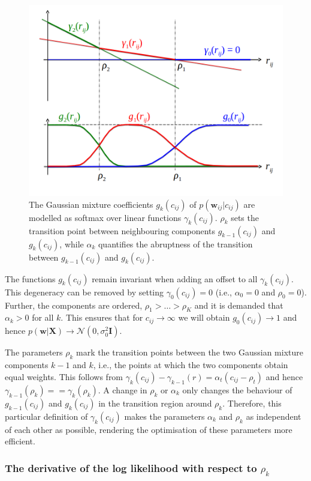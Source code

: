 \documentclass[11pt,a4paper,twoside]{book}
\newcommand{\eq}{\!=\!}
\newcommand{\Gauss}{\mathcal{N}}
\newcommand{\I}{\mathbf{I}}
\newcommand{\cij}{c_{ij}}
\newcommand{\w}{\mathbf{w}}
\newcommand{\wij}{\mathbf{w}_{ij}}
\newcommand{\X}{\mathbf{X}}
\theoremstyle{definition}
\theoremstyle{definition}
\theoremstyle{remark}
\begin{document}
\begin{figure}

{\centering \includegraphics[width=0.5\linewidth]{img/theory/softmax_linear_fct} 

}

\caption{The Gaussian mixture coefficients
\(g_k(\cij)\) of \(p(\wij|\cij)\) are modelled as softmax over linear
functions \(\gamma_k(\cij)\). \(\rho_k\) sets the transition point
between neighbouring components \(g_{k-1}(\cij)\) and \(g_k(\cij)\),
while \(\alpha_k\) quantifies the abruptness of the transition between
\(g_{k-1}(\cij)\) and \(g_k(\cij)\).}\label{fig:softmax-linear-fct}
\end{figure}

The functions \(g_k(\cij)\) remain invariant when adding an offset to
all \(\gamma_k(\cij)\). This degeneracy can be removed by setting
\(\gamma_0(\cij) \eq 0\) (i.e., \(\alpha_0 \eq 0\) and
\(\rho_0 \eq 0\)). Further, the components are ordered,
\(\rho_1> \ldots > \rho_K\) and it is demanded that \(\alpha_k > 0\) for
all \(k\). This ensures that for \(\cij \rightarrow \infty\) we will
obtain \(g_0(\cij) \rightarrow 1\) and hence
\(p(\w | \X) \rightarrow \Gauss(0, \sigma_0^2 \I )\).

The parameters \(\rho_k\) mark the transition points between the two
Gaussian mixture components \(k-1\) and \(k\), i.e., the points at which
the two components obtain equal weights. This follows from
\(\gamma_k(\cij) - \gamma_{k-1}(r) \eq \alpha_{t} ( \cij - \rho_{t})\)
and hence \(\gamma_{k-1}(\rho_k) \eq= \gamma_k(\rho_k)\). A change in
\(\rho_k\) or \(\alpha_k\) only changes the behaviour of
\(g_{k-1}(\cij)\) and \(g_k(\cij)\) in the transition region around
\(\rho_k\). Therefore, this particular definition of \(\gamma_k(\cij)\)
makes the parameters \(\alpha_k\) and \(\rho_k\) as independent of each
other as possible, rendering the optimisation of these parameters more
efficient.

\subsubsection{\texorpdfstring{The derivative of the log likelihood with
respect to
\(\rho_k\)}{The derivative of the log likelihood with respect to \textbackslash{}rho\_k}}\label{the-derivative-of-the-log-likelihood-with-respect-to-rho_k}
\end{document}
